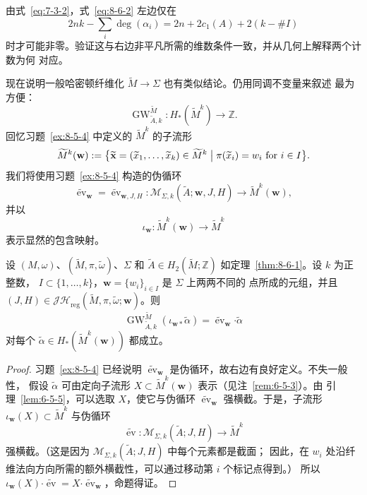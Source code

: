 \begin{exercise}\label{ex:8-6-4}
由式~\eqref{eq:7-3-2}，式~\eqref{eq:8-6-2} 左边仅在
\[
  2nk-\sum_i\deg(\alpha_i)
  =2n+2c_1(A)+2(k-\#I)
\]
时才可能非零。验证这与右边非平凡所需的维数条件一致，并从几何上解释两个计数为何
对应。
\end{exercise}

现在说明一般哈密顿纤维化 $\widetilde M\to\Sigma$ 也有类似结论。仍用同调不变量来叙述
最为方便：
\[
  \operatorname{GW}^{\widetilde M}_{\widetilde A,k}:
  H_*(\widetilde M^k)\longrightarrow\mathbb Z.
\]
回忆习题~\ref{ex:8-5-4} 中定义的 $\widetilde M^k$ 的子流形
\[
  \widetilde M^k(\mathbf w)
  :=\bigl\{\widetilde{\mathbf x}
  =(\widetilde x_1,\ldots,\widetilde x_k)\in\widetilde M^k
  \bigm|\pi(\widetilde x_i)=w_i\text{ for }i\in I\bigr\}.
\]
我们将使用习题~\ref{ex:8-5-4} 构造的伪循环
\[
  \widetilde{\operatorname{ev}}_{\mathbf w}
  =\widetilde{\operatorname{ev}}_{\mathbf w,J,H}:
  \mathcal M_{\Sigma,k}(\widetilde A;\mathbf w,J,H)
  \longrightarrow\widetilde M^k(\mathbf w),
\]
并以
\[
  \iota_{\mathbf w}:\widetilde M^k(\mathbf w)\longrightarrow\widetilde M^k
\]
表示显然的包含映射。

\begin{proposition}\label{prop:8-6-5}
设 $(M,\omega)$、$(\widetilde M,\pi,\widetilde\omega)$、$\Sigma$ 和
$\widetilde A\in H_2(\widetilde M;\mathbb Z)$ 如定理~\ref{thm:8-6-1}。设 $k$ 为正整数，
$I\subset\{1,\ldots,k\}$，$\mathbf w=\{w_i\}_{i\in I}$ 是 $\Sigma$ 上两两不同的
点所成的元组，并且
$(J,H)\in\mathcal{JH}_{\mathrm{reg}}
(\widetilde M,\pi,\widetilde\omega;\mathbf w)$。则
\[
  \operatorname{GW}^{\widetilde M}_{\widetilde A,k}
  (\iota_{\mathbf w*}\widetilde\alpha)
  =\widetilde{\operatorname{ev}}_{\mathbf w}
    \mathbin{\boldsymbol\cdot}\widetilde\alpha
\]
对每个 $\widetilde\alpha\in H_*(\widetilde M^k(\mathbf w))$ 都成立。
\end{proposition}

\begin{proof}
习题~\ref{ex:8-5-4} 已经说明
$\widetilde{\operatorname{ev}}_{\mathbf w}$ 是伪循环，故右边有良好定义。不失一般性，
假设 $\widetilde\alpha$ 可由定向子流形
$X\subset\widetilde M^k(\mathbf w)$ 表示（见注~\ref{rem:6-5-3}）。由
引理~\ref{lem:6-5-5}，可以选取 $X$，使它与伪循环
$\widetilde{\operatorname{ev}}_{\mathbf w}$ 强横截。于是，子流形
$\iota_{\mathbf w}(X)\subset\widetilde M^k$ 与伪循环
\[
  \widetilde{\operatorname{ev}}:
  \mathcal M_{\Sigma,k}(\widetilde A;J,H)\longrightarrow\widetilde M^k
\]
强横截。（这是因为 $\mathcal M_{\Sigma,k}(\widetilde A;J,H)$ 中每个元素都是截面；
因此，在 $w_i$ 处沿纤维法向方向所需的额外横截性，可以通过移动第 $i$ 个标记点得到。）
所以
$\iota_{\mathbf w}(X)\mathbin{\boldsymbol\cdot}\widetilde{\operatorname{ev}}
=X\mathbin{\boldsymbol\cdot}\widetilde{\operatorname{ev}}_{\mathbf w}$，命题得证。
\end{proof}

